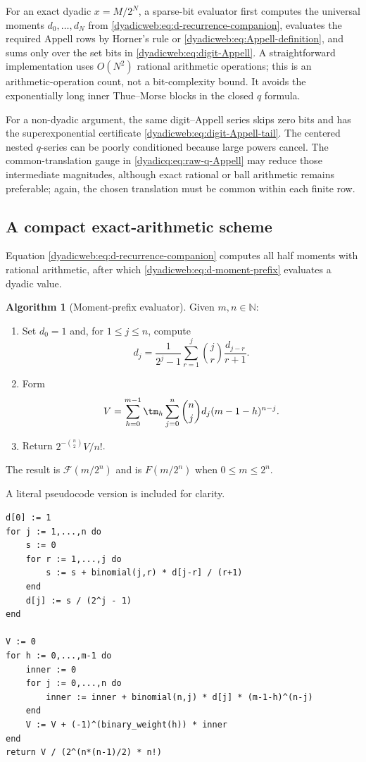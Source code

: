 \documentclass[11pt,oneside]{article}
\theoremstyle{definition}
\newtheorem{algorithm}[algorithm]{Algorithm}
\theoremstyle{remark}
\newcommand{\N}{\mathbb N}
\begin{document}
For an exact dyadic $x=M/2^N$, a sparse-bit evaluator first computes the universal moments
$d_0,\ldots,d_N$ from \eqref{dyadicweb:eq:d-recurrence-companion}, evaluates the required
Appell rows by Horner's rule or \eqref{dyadicweb:eq:Appell-definition}, and sums only over the
set bits in \eqref{dyadicweb:eq:digit-Appell}.  A straightforward implementation uses
$O(N^2)$ rational arithmetic operations; this is an arithmetic-operation count, not a
bit-complexity bound.  It avoids the exponentially long inner Thue--Morse blocks in the closed
$q$ formula.

For a non-dyadic argument, the same digit--Appell series skips zero bits and has the
superexponential certificate \eqref{dyadicweb:eq:digit-Appell-tail}.  The centered nested
$q$-series can be poorly conditioned because large powers cancel.  The common-translation
gauge in \eqref{dyadicq:eq:raw-q-Appell} may reduce those intermediate magnitudes, although
exact rational or ball arithmetic remains preferable; again, the chosen translation must be
common within each finite row.

\subsection{A compact exact-arithmetic scheme}

Equation \eqref{dyadicweb:eq:d-recurrence-companion} computes all half moments with rational arithmetic,
after which \eqref{dyadicweb:eq:d-moment-prefix} evaluates a dyadic value.

\begin{algorithm}[Moment-prefix evaluator]
\label{dyadicweb:alg:moment-prefix}
Given $m,n\in\N$:
\begin{enumerate}
\item Set $d_0=1$ and, for $1\le j\le n$, compute
\[
 d_j=\frac1{2^j-1}\sum_{r=1}^{j}\binom jr\frac{d_{j-r}}{r+1}.
\]
\item Form
\[
 V=\sum_{h=0}^{m-1}\tm_h
   \sum_{j=0}^{n}\binom njd_j(m-1-h)^{n-j}.
\]
\item Return $2^{-\binom n2}V/n!$.
\end{enumerate}
The result is $\mathcal F(m/2^n)$ and is $F(m/2^n)$ when $0\le m\le2^n$.
\end{algorithm}

A literal pseudocode version is included for clarity.

\begin{lstlisting}[style=pseudo,caption={Exact dyadic evaluation from half moments.}]
d[0] := 1
for j := 1,...,n do
    s := 0
    for r := 1,...,j do
        s := s + binomial(j,r) * d[j-r] / (r+1)
    end
    d[j] := s / (2^j - 1)
end

V := 0
for h := 0,...,m-1 do
    inner := 0
    for j := 0,...,n do
        inner := inner + binomial(n,j) * d[j] * (m-1-h)^(n-j)
    end
    V := V + (-1)^(binary_weight(h)) * inner
end
return V / (2^(n*(n-1)/2) * n!)
\end{lstlisting}
\end{document}
